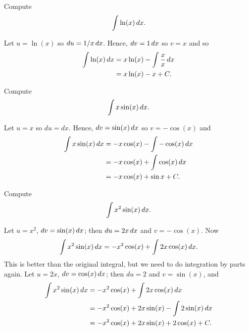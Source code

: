 \begin{example}
Compute
\[
\int \ln(x)\, d x.
\]
\end{example}

\begin{solution}
Let $u=\ln(x)$ so $du=1/x\, d x$. Hence,  $dv=1\, d x$ so $v=x$
and so 
\begin{align*}
 \int \ln(x)\, d x&=x\ln (x)-\int \frac{x}{x}\, d x\\
&= x\ln (x)- x+C.\\
\end{align*}
\end{solution}

\begin{example}
Compute
\[
\int x\sin(x) \, d x.
\]
\end{example}

\begin{solution} Let $u=x$ so $du=dx$. Hence, $dv=\sin(x)\, d x$ so $v=-\cos(x)$ and
\begin{align*}
\int x\sin(x)\, d x &=-x\cos(x)-\int -\cos(x)\, d x\\
&= -x\cos(x)+\int \cos(x)\, d x\\
&=-x\cos(x)+\sin x+C.
\end{align*}
\end{solution}


\begin{example}
Compute
\[
\int x^2\sin(x)\, d x.
\] 
\end{example}

\begin{solution}
Let $u=x^2$, $dv=\sin(x)\, d x$; then $du=2x\, d x$ and $v=-\cos(x)$. 
Now 
\[
\int x^2\sin(x)\, d x=-x^2\cos(x)+\int 2x\cos(x)\, d x.
\] 
This is better than the original integral, but we need to do
integration by parts again. Let $u=2x$, $dv=\cos(x)\, d x$; then $du=2$
and $v=\sin(x)$, and
\begin{align*}
  \int x^2\sin(x)\, d x &=-x^2\cos(x)+\int 2x\cos(x)\, d x \\
  &=-x^2\cos(x)+ 2x\sin(x) - \int 2\sin(x)\, d x \\
  &=-x^2\cos(x)+ 2x\sin(x) + 2\cos(x) + C. 
\end{align*}
\end{solution}

